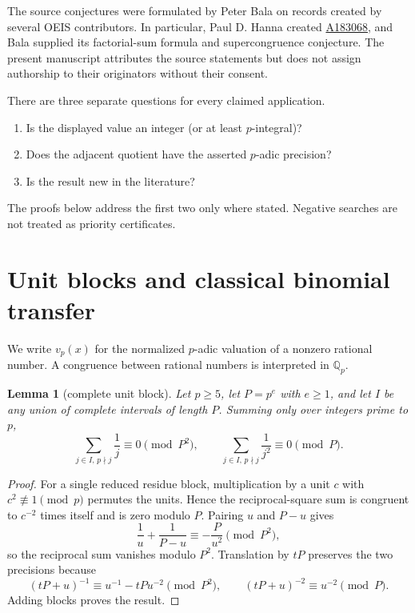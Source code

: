 \documentclass[11pt]{article}
\newtheorem{lemma}[theorem]{Lemma}
\theoremstyle{definition}
\newcommand{\Q}{\mathbb Q}
\newcommand{\OEIS}[1]{\href{https://oeis.org/#1}{#1}}
\begin{document}
The source conjectures were formulated by Peter Bala on records created by
several OEIS contributors.  In particular, Paul D. Hanna created
\OEIS{A183068}, and Bala supplied its factorial-sum formula and
supercongruence conjecture.  The present manuscript attributes the source
statements but does not assign authorship to their originators without
their consent.

There are three separate questions for every claimed application.
\begin{enumerate}
\item Is the displayed value an integer (or at least $p$-integral)?
\item Does the adjacent quotient have the asserted $p$-adic precision?
\item Is the result new in the literature?
\end{enumerate}
The proofs below address the first two only where stated.  Negative searches
are not treated as priority certificates.

\section{Unit blocks and classical binomial transfer}

We write $v_p(x)$ for the normalized $p$-adic valuation of a nonzero
rational number.  A congruence between rational numbers is interpreted in
$\Q_p$.

\begin{lemma}[complete unit block]\label{lem:unit}
Let $p\geq5$, let $P=p^e$ with $e\geq1$, and let $I$ be any union of
complete intervals of length $P$.  Summing only over integers prime to $p$,
\[
 \sum_{j\in I,\,p\nmid j}\frac1j\equiv0\pmod {P^2},
 \qquad
 \sum_{j\in I,\,p\nmid j}\frac1{j^2}\equiv0\pmod P.
\]
\end{lemma}

\begin{proof}
For a single reduced residue block, multiplication by a unit $c$ with
$c^2\not\equiv1\pmod p$ permutes the units.  Hence the reciprocal-square
sum is congruent to $c^{-2}$ times itself and is zero modulo $P$.
Pairing $u$ and $P-u$ gives
\[
 \frac1u+\frac1{P-u}\equiv-\frac P{u^2}\pmod {P^2},
\]
so the reciprocal sum vanishes modulo $P^2$.  Translation by $tP$ preserves
the two precisions because
\[
 (tP+u)^{-1}\equiv u^{-1}-tPu^{-2}\pmod {P^2},\qquad
 (tP+u)^{-2}\equiv u^{-2}\pmod P.
\]
Adding blocks proves the result.
\end{proof}
\end{document}
